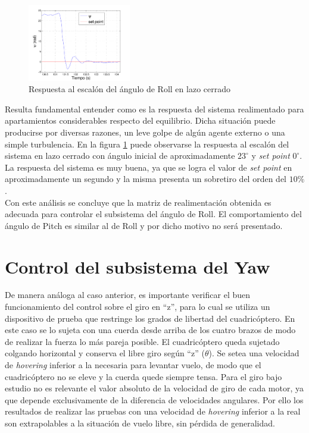 \documentclass[main]{subfiles}
\begin{document}
\begin{figure}
	\vspace{10pt}
	\centering
	\includegraphics[width=0.4\textwidth]{./pics_test_control/psi_esc.pdf}
	\caption{Respuesta al escal\'on del \'angulo de Roll en lazo cerrado}
	\label{fig:psi_esc}
\end{figure}

Resulta fundamental entender como es la respuesta del sistema realimentado para apartamientos considerables respecto del equilibrio. Dicha situaci\'on puede producirse por diversas razones, un leve golpe de alg\'un agente externo o una simple turbulencia. En la figura \ref{fig:psi_esc} puede observarse la respuesta al escal\'on del sistema en lazo cerrado	con \'angulo inicial de aproximadamente $23 ^\circ$ y \emph{set point} $0 ^\circ$. La respuesta del sistema es muy buena, ya que se logra el valor de \emph{set point} en aproximadamente un segundo y la misma presenta un sobretiro del orden del $10\%$. \\

Con este an\'alisis se concluye que la matriz de realimentaci\'on obtenida es adecuada para controlar el subsistema del \'angulo de Roll. El comportamiento del \'angulo de Pitch es similar al de Roll y por dicho motivo no ser\'a presentado. 

\section{Control del subsistema del Yaw}


De manera an\'aloga al caso anterior, es importante verificar el buen funcionamiento del control sobre el giro en ``z'', para lo cual se utiliza un dispositivo de prueba que restringe los grados de libertad del cuadric\'optero. En este caso se lo sujeta con una cuerda desde arriba de los cuatro brazos de modo de realizar la fuerza lo m\'as pareja posible. El cuadric\'optero queda sujetado colgando horizontal y conserva el libre giro seg\'un ``z'' ($\theta$).
Se setea una velocidad de \emph{hovering} inferior a la necesaria para levantar vuelo, de modo que el cuadric\'optero no se eleve y la cuerda quede siempre tensa. Para el giro bajo estudio no es relevante el valor absoluto de la velocidad de giro de cada motor, ya que depende exclusivamente de la diferencia de velocidades angulares. Por ello los resultados de realizar las pruebas con una velocidad de \emph{hovering} inferior a la real son extrapolables a la situaci\'on de vuelo libre, sin p\'erdida de generalidad.\\
\end{document}
